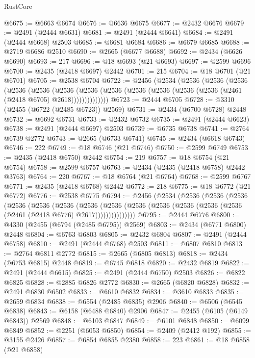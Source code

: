 \begin{lexlean}{RustCore}
\begin{coremodule}
@6675 := @6663 @6674
@6676 := @6636 @6675
@6677 := @2432 @6676
@6679 := @2491 (@2444 @6631)
@6681 := @2491 (@2444 @6641)
@6684 := @2491 (@2444 @6668) @2503
@6685 := @6681 @6684
@6686 := @6679 @6685
@6688 := @2719 @6686 @2510
@6690 := @2665 (@6677 @6688)
@6692 := @2434 (@6626 @6690)
@6693 := 217
@6696 := @18 @6693 (@21 @6693)
@6697 := @2599 @6696
@6700 := @2435 (@2418 @6697) @2442
@6701 := 215
@6704 := @18 @6701 (@21 @6701)
@6705 := @2538 @6704
@6722 := @2456
    (@2534
      (@2536
        (@2536
          (@2536
            (@2536
              (@2536
                (@2536
                  (@2536 (@2536 (@2536 (@2536 (@2536 (@2536 (@2461 (@2418 @6705) @2618))))))))))))))
@6723 := @2444 @6705
@6728 := @3310 (@2455 (@6722 (@2485 @6723)) @2569)
@6731 := @2434 (@6700 @6728) @2448
@6732 := @6692 @6731
@6733 := @2432 @6732
@6735 := @2491 (@2444 @6623)
@6738 := @2491 (@2444 @6697) @2503
@6739 := @6735 @6738
@6741 := @2764 @6739 @2772
@6743 := @2665 (@6733 @6741)
@6745 := @2434 (@6618 @6743)
@6746 := 222
@6749 := @18 @6746 (@21 @6746)
@6750 := @2599 @6749
@6753 := @2435 (@2418 @6750) @2442
@6754 := 219
@6757 := @18 @6754 (@21 @6754)
@6758 := @2599 @6757
@6763 := @2434 (@2435 (@2418 @6758) @2442 @3763)
@6764 := 220
@6767 := @18 @6764 (@21 @6764)
@6768 := @2599 @6767
@6771 := @2435 (@2418 @6768) @2442
@6772 := 218
@6775 := @18 @6772 (@21 @6772)
@6776 := @2538 @6775
@6794 := @2456
    (@2534
      (@2536
        (@2536
          (@2536
            (@2536
              (@2536
                (@2536
                  (@2536
                    (@2536
                      (@2536 (@2536 (@2536 (@2536 (@2536 (@2461 (@2418 @6776) @2617)))))))))))))))
@6795 := @2444 @6776
@6800 := @4330 (@2455 (@6794 (@2485 @6795)) @2569)
@6803 := @2434 (@6771 @6800) @2448
@6804 := @6763 @6803
@6805 := @2432 @6804
@6807 := @2491 (@2444 @6758)
@6810 := @2491 (@2444 @6768) @2503
@6811 := @6807 @6810
@6813 := @2764 @6811 @2772
@6815 := @2665 (@6805 @6813)
@6818 := @2434 (@6753 @6815) @2448
@6819 := @6745 @6818
@6820 := @2432 @6819
@6822 := @2491 (@2444 @6615)
@6825 := @2491 (@2444 @6750) @2503
@6826 := @6822 @6825
@6828 := @2885 @6826 @2772
@6830 := @2665 (@6820 @6828)
@6832 := @2491 @6830 @6502
@6833 := @6610 @6832
@6834 := @3610 @6833
@6835 := @2659 @6834
@6838 := @6554 (@2485 @6835) @2906
@6840 := @6506 (@6545 @6838)
@6843 := @6158 (@6488 @6840) @2906
@6847 := @2455 (@6105 (@6149 @6843)) @2569
@6848 := @6103 @6847
@6849 := @6101 @6848
@6850 := @6099 @6849
@6852 := @2251 (@6053 @6850)
@6854 := @2409 (@2412 @192)
@6855 := @3155 @2426
@6857 := @6854 @6855 @2380
@6858 := 223
@6861 := @18 @6858 (@21 @6858)

\end{coremodule}
\end{lexlean}
